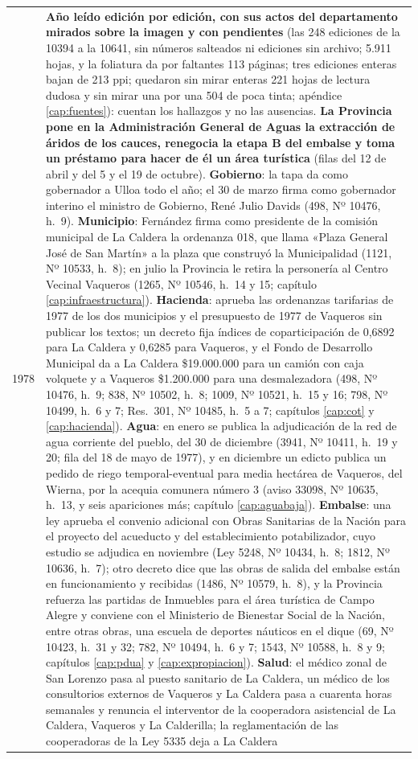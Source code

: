 \begin{longtable}{@{}p{2.7cm}p{10.3cm}@{}}
1978 & \textbf{Año leído edición por edición, con sus actos del departamento mirados sobre la imagen y con pendientes} (las 248 ediciones de la 10394 a la 10641, sin números salteados ni ediciones sin archivo; 5.911 hojas, y la foliatura da por faltantes 113 páginas; tres ediciones enteras bajan de 213 ppi; quedaron sin mirar enteras 221 hojas de lectura dudosa y sin mirar una por una 504 de poca tinta; apéndice \ref{cap:fuentes}): cuentan los hallazgos y no las ausencias. \textbf{La Provincia pone en la Administración General de Aguas la extracción de áridos de los cauces, renegocia la etapa B del embalse y toma un préstamo para hacer de él un área turística} (filas del 12 de abril y del 5 y el 19 de octubre). \textbf{Gobierno}: la tapa da como gobernador a Ulloa todo el año; el 30 de marzo firma como gobernador interino el ministro de Gobierno, René Julio Davids (498, Nº 10476, h.\ 9). \textbf{Municipio}: Fernández firma como presidente de la comisión municipal de La Caldera la ordenanza 018, que llama «Plaza General José de San Martín» a la plaza que construyó la Municipalidad (1121, Nº 10533, h.\ 8); en julio la Provincia le retira la personería al Centro Vecinal Vaqueros (1265, Nº 10546, h.\ 14 y 15; capítulo \ref{cap:infraestructura}). \textbf{Hacienda}: aprueba las ordenanzas tarifarias de 1977 de los dos municipios y el presupuesto de 1977 de Vaqueros sin publicar los textos; un decreto fija índices de coparticipación de 0,6892 para La Caldera y 0,6285 para Vaqueros, y el Fondo de Desarrollo Municipal da a La Caldera \$19.000.000 para un camión con caja volquete y a Vaqueros \$1.200.000 para una desmalezadora (498, Nº 10476, h.\ 9; 838, Nº 10502, h.\ 8; 1009, Nº 10521, h.\ 15 y 16; 798, Nº 10499, h.\ 6 y 7; Res.\ 301, Nº 10485, h.\ 5 a 7; capítulos \ref{cap:cot} y \ref{cap:hacienda}). \textbf{Agua}: en enero se publica la adjudicación de la red de agua corriente del pueblo, del 30 de diciembre (3941, Nº 10411, h.\ 19 y 20; fila del 18 de mayo de 1977), y en diciembre un edicto publica un pedido de riego temporal-eventual para media hectárea de Vaqueros, del Wierna, por la acequia comunera número 3 (aviso 33098, Nº 10635, h.\ 13, y seis apariciones más; capítulo \ref{cap:aguabaja}). \textbf{Embalse}: una ley aprueba el convenio adicional con Obras Sanitarias de la Nación para el proyecto del acueducto y del establecimiento potabilizador, cuyo estudio se adjudica en noviembre (Ley 5248, Nº 10434, h.\ 8; 1812, Nº 10636, h.\ 7); otro decreto dice que las obras de salida del embalse están en funcionamiento y recibidas (1486, Nº 10579, h.\ 8), y la Provincia refuerza las partidas de Inmuebles para el área turística de Campo Alegre y conviene con el Ministerio de Bienestar Social de la Nación, entre otras obras, una escuela de deportes náuticos en el dique (69, Nº 10423, h.\ 31 y 32; 782, Nº 10494, h.\ 6 y 7; 1543, Nº 10588, h.\ 8 y 9; capítulos \ref{cap:pdua} y \ref{cap:expropiacion}). \textbf{Salud}: el médico zonal de San Lorenzo pasa al puesto sanitario de La Caldera, un médico de los consultorios externos de Vaqueros y La Caldera pasa a cuarenta horas semanales y renuncia el interventor de la cooperadora asistencial de La Caldera, Vaqueros y La Calderilla; la reglamentación de las cooperadoras de la Ley 5335 deja a La Caldera 
\end{longtable}
